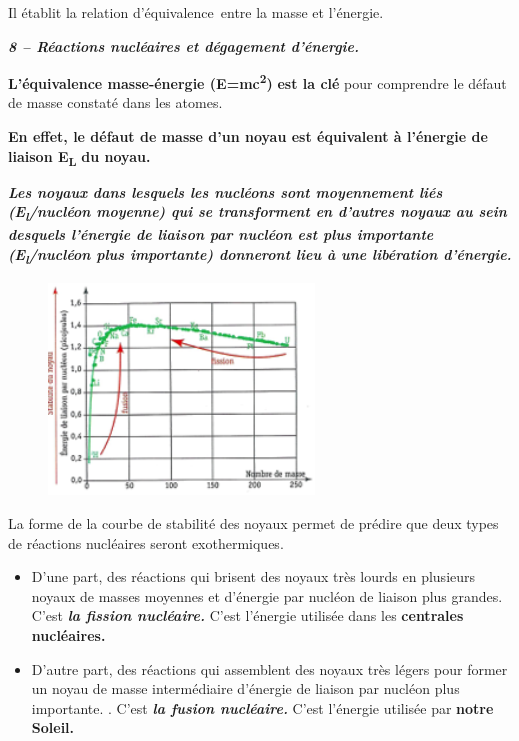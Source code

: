 Il établit la relation d'équivalence~entre la masse et l'énergie.

\emph{\textbf{8 -- Réactions nucléaires et dégagement d'énergie. }}

\textbf{L'équivalence masse-énergie
(E=mc}\textsuperscript{\textbf{2}}\textbf{)} \textbf{est la clé }pour
comprendre le défaut de masse constaté dans les atomes.

\textbf{En effet, le défaut de masse d'un noyau est équivalent à
l'énergie de liaison E}\textsubscript{\textbf{L}}\textbf{ du noyau. }

\emph{\textbf{Les noyaux dans lesquels les nucléons sont moyennement
liés (E}}\textsubscript{\emph{\textbf{l}}}\emph{\textbf{/nucléon
moyenne) qui se transforment en d'autres noyaux au sein desquels
l'énergie de liaison par nucléon est plus importante
(E}}\textsubscript{\emph{\textbf{l}}}\emph{\textbf{/nucléon plus
importante) donneront lieu à une libération d'énergie. }}

\begin{figure}
\centering
\includegraphics[width=7.056cm,height=5.644cm]{Pictures/10000001000000E2000000B4942537CB26E0723C.png}
\caption{}
\end{figure}

La forme de la courbe de stabilité des noyaux permet de prédire que deux
types de réactions nucléaires seront exothermiques.

\begin{itemize}
\tightlist
\item
  D'une part, des réactions qui brisent des noyaux très lourds en
  plusieurs noyaux de masses moyennes et d'énergie par nucléon de
  liaison plus grandes. C'est \emph{\textbf{la fission nucléaire.}}
  C'est\emph{\textbf{ }}l'énergie utilisée dans les \textbf{centrales
  nucléaires.}
\item
  D'autre part, des réactions qui assemblent des noyaux très légers pour
  former un noyau de masse intermédiaire d'énergie de liaison par
  nucléon plus importante. . C'est \emph{\textbf{la fusion nucléaire.}}
  C'est l'énergie utilisée par \textbf{notre Soleil.}
\end{itemize}

